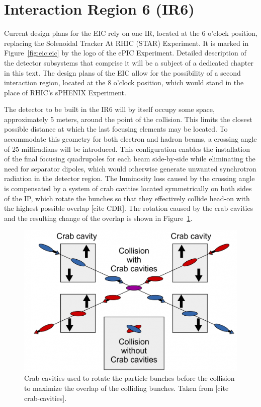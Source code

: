 \section{Interaction Region 6 (IR6)}
Current design plans for the EIC rely on one IR, located at the 6 o'clock position, replacing the Solenoidal Tracker At RHIC (STAR) Experiment. It is marked in Figure~\ref{fig:eic:eic} by the logo of the ePIC Experiment. Detailed description of the detector subsystems that comprise it will be a subject of a dedicated chapter in this text. The design plans of the EIC allow for the possibility of a second interaction region, located at the 8 o'clock position, which would stand in the place of RHIC's sPHENIX Experiment.

The detector to be built in the IR6 will by itself occupy some space, approximately 5 meters, around the point of the collision. This limits the closest possible distance at which the last focusing elements may be located. To accommodate this geometry for both electron and hadron beams, a crossing angle of 25 milliradians will be introduced. This configuration enables the installation of the final focusing quadrupoles for each beam side-by-side while eliminating the need for separator dipoles, which would otherwise generate unwanted synchrotron radiation in the detector region. The luminosity loss caused by the crossing angle is compensated by a system of crab cavities located symmetrically on both sides of the IP, which rotate the bunches so that they effectively collide head-on with the highest possible overlap [cite CDR]. The rotation caused by the crab cavities and the resulting change of the overlap is shown in Figure~\ref{fig:eic:crab}.

\begin{figure}[ht]
    \centering
    \includegraphics[width=.6\linewidth]{img/crab_cavities.jpg}
    \caption{Crab cavities used to rotate the particle bunches before the collision to maximize the overlap of the colliding bunches. Taken from [cite crab-cavities].}
    \label{fig:eic:crab}
\end{figure}

